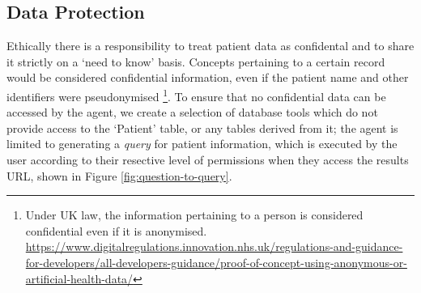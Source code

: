 \documentclass[11pt]{article}
\begin{document}



\subsection{Data Protection} 
Ethically there is a responsibility to treat patient data as confidental and to share it strictly on a `need to know' basis.
Concepts pertaining to a certain record would be considered confidential information, even if the patient name and other identifiers were pseudonymised
\footnote{Under UK law, the information pertaining to a person is considered confidential even if it is anonymised.
\url{https://www.digitalregulations.innovation.nhs.uk/regulations-and-guidance-for-developers/all-developers-guidance/proof-of-concept-using-anonymous-or-artificial-health-data/}
}. 
To ensure that no confidential data can be accessed by the agent, we create a selection of database tools which do not provide access to the `Patient' table, or any tables derived from it; the agent is limited to generating a \textit{query} for patient information, which is executed by the user according to their resective level of permissions when they access the results URL, shown in Figure \ref{fig:question-to-query}.
\end{document}
